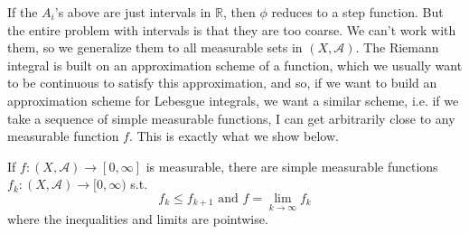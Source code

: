     If the $A_i$'s above are just intervals in $\mathbb{R}$, then $\phi$ reduces to a step function. But the entire problem with intervals is that they are too coarse. We can't work with them, so we generalize them to all measurable sets in $(X, \mathcal{A})$. The Riemann integral is built on an approximation scheme of a function, which we usually want to be continuous to satisfy this approximation, and so, if we want to build an approximation scheme for Lebesgue integrals, we want a similar scheme, i.e. if we take a sequence of simple measurable functions, I can get arbitrarily close to any measurable function $f$. This is exactly what we show below. 

    \begin{theorem}
      If $f: (X, \mathcal{A}) \longrightarrow [0, \infty]$ is measurable, there are simple measurable functions $f_k : (X, \mathcal{A}) \longrightarrow [0, \infty)$ s.t. 
      \begin{equation}
        f_k \leq f_{k+1} \text{ and } f = \lim_{k \rightarrow \infty} f_k
      \end{equation}
      where the inequalities and limits are pointwise. 
    \end{theorem}
